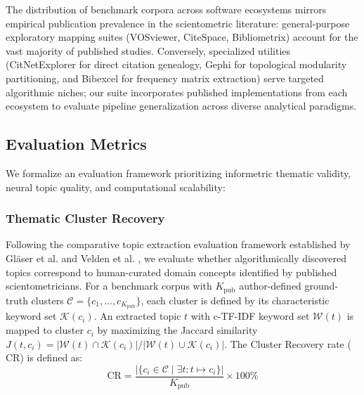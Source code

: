 \documentclass[preprint,12pt]{elsarticle}
\begin{document}


The distribution of benchmark corpora across software ecosystems mirrors empirical publication prevalence in the scientometric literature: general-purpose exploratory mapping suites (VOSviewer, CiteSpace, Bibliometrix) account for the vast majority of published studies. Conversely, specialized utilities (CitNetExplorer for direct citation genealogy, Gephi for topological modularity partitioning, and Bibexcel for frequency matrix extraction) serve targeted algorithmic niches; our suite incorporates published implementations from each ecosystem to evaluate pipeline generalization across diverse analytical paradigms.



\subsection{Evaluation Metrics}
We formalize an evaluation framework prioritizing informetric thematic validity, neural topic quality, and computational scalability:

\subsubsection{Thematic Cluster Recovery}
Following the comparative topic extraction evaluation framework established by Gl{\"a}ser et al. \cite{glaser2017same} and Velden et al. \cite{velden2017comparison}, we evaluate whether algorithmically discovered topics correspond to human-curated domain concepts identified by published scientometricians. For a benchmark corpus with $K_{\text{pub}}$ author-defined ground-truth clusters $\mathcal{C} = \{c_1, \dots, c_{K_{\text{pub}}}\}$, each cluster is defined by its characteristic keyword set $\mathcal{K}(c_i)$. An extracted topic $t$ with c-TF-IDF keyword set $\mathcal{W}(t)$ is mapped to cluster $c_i$ by maximizing the Jaccard similarity $J(t, c_i) = |\mathcal{W}(t) \cap \mathcal{K}(c_i)| / |\mathcal{W}(t) \cup \mathcal{K}(c_i)|$. The Cluster Recovery rate ($\text{CR}$) is defined as:
\begin{equation}
\text{CR} = \frac{|\{c_i \in \mathcal{C} \mid \exists t : t \mapsto c_i\}|}{K_{\text{pub}}} \times 100\%
\end{equation}
\end{document}
